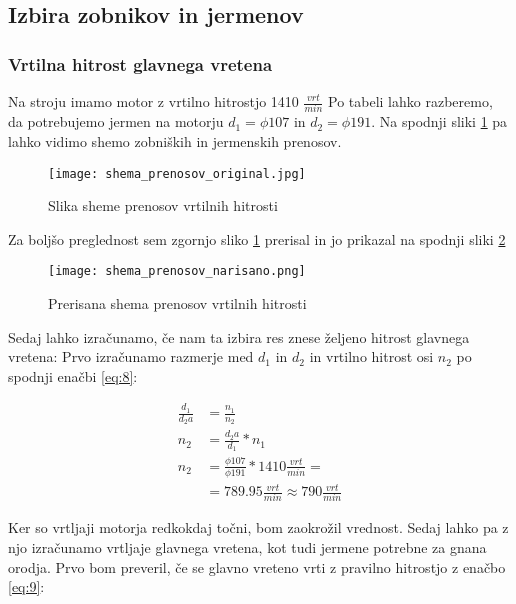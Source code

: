 \subsection{Izbira zobnikov in jermenov}
\subsubsection{Vrtilna hitrost glavnega vretena}
Na stroju imamo motor z vrtilno hitrostjo 1410 \( \frac{vrt}{min} \)
Po tabeli  lahko razberemo, da potrebujemo jermen na motorju
\( d_1 = \phi 107 \) in \( d_2 = \phi 191 \).
Na spodnji sliki \ref{slika_prenosov} pa lahko vidimo shemo
zobniških in jermenskih prenosov.

\begin{figure}[H]
	\begin{center}
		\texttt{[image: shema\_prenosov\_original.jpg]}
		\caption{Slika sheme prenosov vrtilnih hitrosti
			\cite{gauthier}}
		\label{slika_prenosov}
	\end{center}
\end{figure}

Za boljšo preglednost sem zgornjo sliko \ref{slika_prenosov}
prerisal in jo prikazal na spodnji sliki \ref{skica_prenosov}

\begin{figure}[H]
	\begin{center}
		\texttt{[image: shema\_prenosov\_narisano.png]}
		\caption{Prerisana shema prenosov vrtilnih hitrosti
			\cite{lasten}}
		\label{skica_prenosov}
	\end{center}
\end{figure}

Sedaj lahko izračunamo, če nam ta izbira res znese željeno hitrost glavnega vretena:
Prvo izračunamo razmerje med \( d_1 \) in \( d_2 \) in vrtilno hitrost osi \(n_2\)
po spodnji enačbi \ref{eq:8}:

\begin{equation}
	\label{eq:8}
	\begin{split}
		\frac{d_1}{d_2a} &= \frac{n_1}{n_2} \\
		n_2 &= \frac{d_2a}{d_1} * n_1 \\
		n_2 &= \frac{\phi 107}{\phi 191} * 1410 \frac{vrt}{min} = \\
		&= 789.95 \frac{vrt}{min} \approx 790 \frac{vrt}{min}
	\end{split}
\end{equation}

Ker so vrtljaji motorja redkokdaj točni, bom zaokrožil vrednost. Sedaj
lahko pa z njo izračunamo vrtljaje glavnega vretena, kot tudi jermene
potrebne za gnana orodja. Prvo bom preveril, če se glavno vreteno vrti z
pravilno hitrostjo z enačbo \ref{eq:9}:

